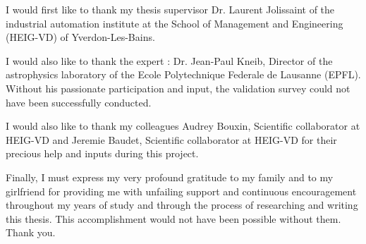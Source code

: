 \documentclass[11pt,english,singlespacing,headsepline]{MastersDoctoralThesis} %
\begin{document}

\begin{acknowledgements}
\addchaptertocentry{\acknowledgementname} %
I would first like to thank my thesis supervisor Dr. Laurent Jolissaint of the industrial automation institute at the School of Management and Engineering (HEIG-VD) of Yverdon-Les-Bains. 

I would also like to thank the expert : Dr. Jean-Paul Kneib, Director of the astrophysics laboratory of the Ecole Polytechnique Federale de Lausanne (EPFL). Without his passionate participation and input, the validation survey could not have been successfully conducted.

I would also like to thank my colleagues Audrey Bouxin, Scientific collaborator at HEIG-VD and Jeremie Baudet, Scientific collaborator at HEIG-VD for their precious help and inputs during this project.

Finally, I must express my very profound gratitude to my family and to my girlfriend for providing me with unfailing support and continuous encouragement throughout my years of study and through the process of researching and writing this thesis. This accomplishment would not have been possible without them. Thank you.
\end{acknowledgements}


\tableofcontents %

\listoffigures %


\end{document}
